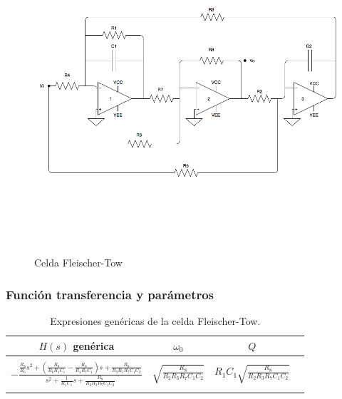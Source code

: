 \begin{figure}[H] %
	\centering
	\includegraphics[width=12cm,height=12cm,keepaspectratio]{../EJ4/imagenes/FLEISCHER.png}
	\caption{Celda Fleischer-Tow}
	\label{fleischer}
\end{figure}

\subsubsection{Funci\'on transferencia y par\'ametros}

\begin{table}[H] %
	\centering
	\begin{tabular}{c c c c}
		$H(s)$ gen\'erica & $\omega_0$ & $Q$\\
		\hline \\
		$- \frac{\frac{R_8}{R_6}s^2+\left(\frac{R_8}{R_6R_1C_1}-\frac{R_8}{R_4R_7C_1}\right)s+\frac{R_8}{R_3R_5R_7C_1C_2}}{s^2+\frac{1}{R_1C_1}s+\frac{R_8}{R_2R_3R_7C_1C_2}}$&$\sqrt{\frac{R_8}{R_2R_3R_7C_1C_2}}$&$R_1C_1\sqrt{\frac{R_8}{R_2R_3R_7C_1C_2}}$\\ \\
		\hline
	\end{tabular}
	\caption{Expresiones gen\'ericas de la celda Fleischer-Tow.}
	\label{f_generica}
\end{table}


